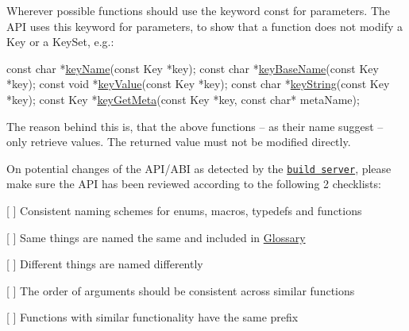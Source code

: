 Wherever possible functions should use the keyword {\ttfamily const} for parameters. The A\+PI uses this keyword for parameters, to show that a function does not modify a {\ttfamily Key} or a {\ttfamily Key\+Set}, e.\+g.\+:


\begin{DoxyCode}
\textcolor{keyword}{const} \textcolor{keywordtype}{char} *\hyperlink{group__keyname_ga8e805c726a60da921d3736cda7813513}{keyName}(\textcolor{keyword}{const} Key *key);
\textcolor{keyword}{const} \textcolor{keywordtype}{char} *\hyperlink{group__keyname_gaaff35e7ca8af5560c47e662ceb9465f5}{keyBaseName}(\textcolor{keyword}{const} Key *key);
\textcolor{keyword}{const} \textcolor{keywordtype}{void} *\hyperlink{group__keyvalue_ga6f29609c5da53c6dc26a98678d5752af}{keyValue}(\textcolor{keyword}{const} Key *key);
\textcolor{keyword}{const} \textcolor{keywordtype}{char} *\hyperlink{group__keyvalue_ga880936f2481d28e6e2acbe7486a21d05}{keyString}(\textcolor{keyword}{const} Key *key);
\textcolor{keyword}{const} Key  *\hyperlink{group__keymeta_ga9ed3875495ddb3d8a8d29158a60a147c}{keyGetMeta}(\textcolor{keyword}{const} Key *key, \textcolor{keyword}{const} \textcolor{keywordtype}{char}* metaName);
\end{DoxyCode}


The reason behind this is, that the above functions – as their name suggest – only retrieve values. The returned value must not be modified directly.

On potential changes of the A\+P\+I/\+A\+BI as detected by the \href{https://build.libelektra.org/job/libelektra/job/master/}{\tt {\ttfamily build server}}, please make sure the A\+PI has been reviewed according to the following 2 checklists\+:


\begin{DoxyItemize}
\item \mbox{[} \mbox{]} Consistent naming schemes for enums, macros, typedefs and functions
\item \mbox{[} \mbox{]} Same things are named the same and included in \hyperlink{doc_help_elektra-glossary_md}{Glossary}
\item \mbox{[} \mbox{]} Different things are named differently
\item \mbox{[} \mbox{]} The order of arguments should be consistent across similar functions
\end{DoxyItemize}


\begin{DoxyItemize}
\item \mbox{[} \mbox{]} Functions with similar functionality have the same prefix
\end{DoxyItemize}



